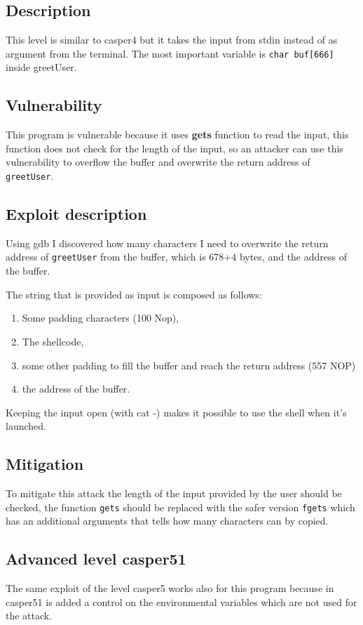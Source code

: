 \documentclass[a4paper,12pt]{article}
\begin{document}
\subsection{Description}
This level is similar to casper4 but it takes the input from stdin instead of as argument from the terminal.
The most important variable is \texttt{char buf[666]} inside greetUser.


\subsection{Vulnerability}
This program is vulnerable because it uses \textbf{gets} function to read the input, this function does not check for the length of the input, so an attacker can use this vulnerability to overflow the buffer and overwrite the return address of \texttt{greetUser}.


\subsection{Exploit description}
Using gdb I discovered how many characters I need to overwrite the return address of \texttt{greetUser} from the buffer, which is 678+4 bytes, and the address of the buffer.

The string that is provided as input is composed as follows:
\begin{enumerate}
\item Some padding characters (100 Nop),
\item The shellcode,
\item some other padding to fill the buffer and reach the return address (557 NOP)
\item the address of the buffer.
\end{enumerate}

Keeping the input open (with cat -) makes it possible to use the shell when it's launched.


\subsection{Mitigation}

To mitigate this attack the length of the input provided by the user should be checked, the function \texttt{gets} should be replaced with the safer version \texttt{fgets} which has an additional arguments that tells how many characters can by copied.

\subsection{Advanced level casper51}
The same exploit of the level casper5 works also for this program because in casper51 is added a control on the environmental variables which are not used for the attack. 
\end{document}
